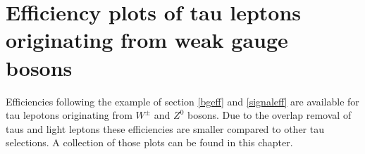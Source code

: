 \section{Efficiency plots of tau leptons originating from weak gauge bosons}\label{promptplots}
Efficiencies following the example of section \ref{bgeff} and \ref{signaleff} are available for tau lepotons originating from $W^\pm$ and $Z^0$ bosons. Due to the overlap removal of taus and light leptons these efficiencies are smaller compared to other tau selections. A collection of those plots can be found in this chapter.

\listoffigures
{}%
\listoftables
{}%


